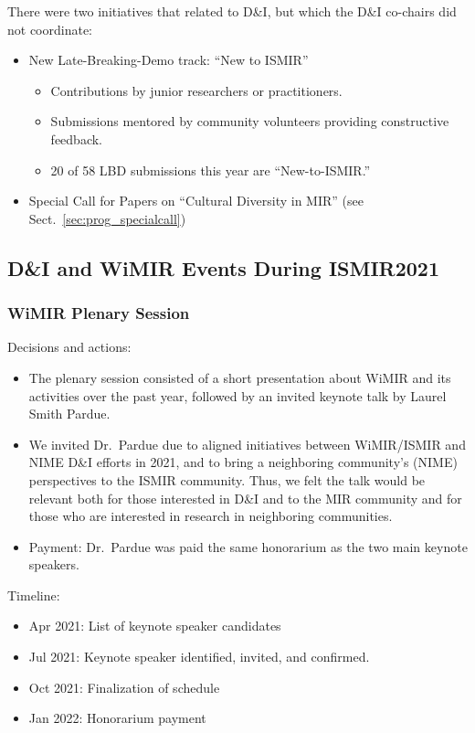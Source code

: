 \documentclass[%
10pt,								%
titlepage,						%
]
{scrartcl}
\begin{document}
        There were two initiatives that related to D\&I, but which the D\&I co-chairs did not coordinate:
        \begin{itemize}
            \item   New Late-Breaking-Demo track: ``New to ISMIR''
                \begin{itemize}
                    \item   Contributions by junior researchers or practitioners.
                    \item   Submissions mentored by community volunteers providing constructive feedback.
                    \item   20 of 58 LBD submissions this year are ``New-to-ISMIR.''
                \end{itemize}
            \item   Special Call for Papers on ``Cultural Diversity in MIR'' (see Sect.~\ref{sec:prog_specialcall})
        \end{itemize}

    \subsection{D\&I and WiMIR Events During ISMIR2021}
        \subsubsection{WiMIR Plenary Session}\label{sec:di_plenary}
            Decisions and actions:
            \begin{itemize}
                \item   The plenary session consisted of a short presentation about WiMIR and its activities over the past year, followed by an invited keynote talk by Laurel Smith Pardue.
                \item   We invited Dr.\ Pardue due to aligned initiatives between WiMIR/ISMIR and NIME D\&I efforts in 2021, and to bring a neighboring community's (NIME) perspectives to the ISMIR community. Thus, we felt the talk would be relevant both for those interested in D\&I and to the MIR community and for those who are interested in research in neighboring communities.
                \item   Payment: Dr.\ Pardue was paid the same honorarium as the two main keynote speakers.
            \end{itemize}

            Timeline:
            \begin{itemize}
                \item   Apr 2021: List of keynote speaker candidates
                \item   Jul 2021: Keynote speaker identified, invited, and confirmed.
                \item   Oct 2021: Finalization of schedule
                \item   Jan 2022: Honorarium payment 
            \end{itemize}
\end{document}
